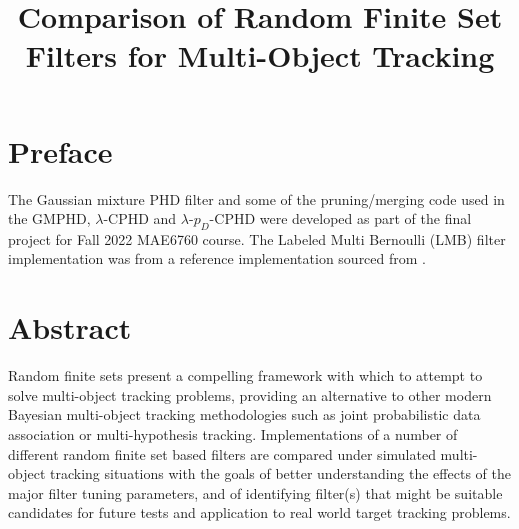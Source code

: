 \documentclass{article}
\title{Comparison of Random Finite Set Filters for Multi-Object Tracking}
\author{\name}
\newcommand{\lcphd}{$\lambda$-CPHD}
\newcommand{\lpdcphd}{$\lambda$-$p_D$-CPHD}
\begin{document}
\maketitle
\pagebreak


\section*{Preface}
The Gaussian mixture PHD filter and some of the pruning/merging code used in the GMPHD, \lcphd{} and \lpdcphd{} were developed as part of the final project for Fall 2022 MAE6760 course. The Labeled Multi Bernoulli (LMB) filter implementation was from a reference implementation sourced from \cite{vo_rfs}.

\section*{Abstract}
Random finite sets present a compelling framework with which to attempt to solve multi-object tracking problems, providing an alternative to other modern Bayesian multi-object tracking methodologies such as joint probabilistic data association or multi-hypothesis tracking. Implementations of a number of different random finite set based filters are compared under simulated multi-object tracking situations with the goals of better understanding the effects of the major filter tuning parameters, and of identifying filter(s) that might be suitable candidates for future tests and application to real world target tracking problems.

\tableofcontents
\listoffigures
\listoftables
\end{document}
